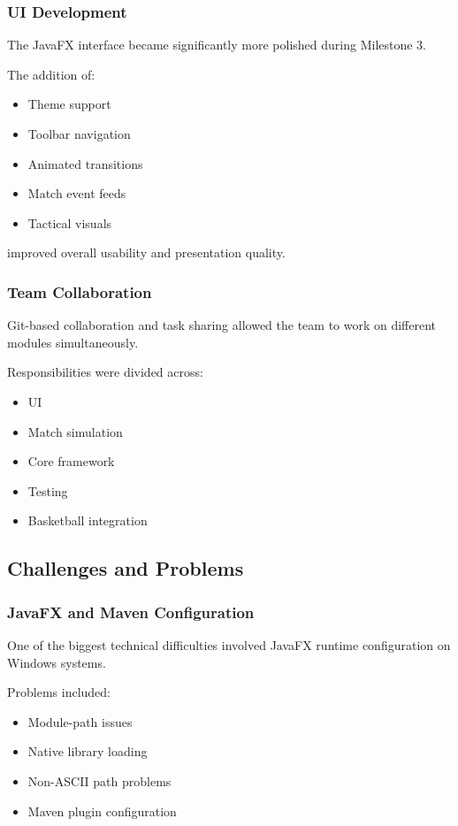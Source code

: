 \documentclass[11pt,a4paper]{article}
\begin{document}
\subsubsection*{UI Development}

The JavaFX interface became significantly more polished during Milestone 3.

The addition of:
\begin{itemize}
\item Theme support
\item Toolbar navigation
\item Animated transitions
\item Match event feeds
\item Tactical visuals
\end{itemize}

improved overall usability and presentation quality.

\subsubsection*{Team Collaboration}

Git-based collaboration and task sharing allowed the team to work on different modules simultaneously.

Responsibilities were divided across:
\begin{itemize}
\item UI
\item Match simulation
\item Core framework
\item Testing
\item Basketball integration
\end{itemize}

\subsection{Challenges and Problems}

\subsubsection*{JavaFX and Maven Configuration}

One of the biggest technical difficulties involved JavaFX runtime configuration on Windows systems.

Problems included:
\begin{itemize}
\item Module-path issues
\item Native library loading
\item Non-ASCII path problems
\item Maven plugin configuration
\end{itemize}
\end{document}
